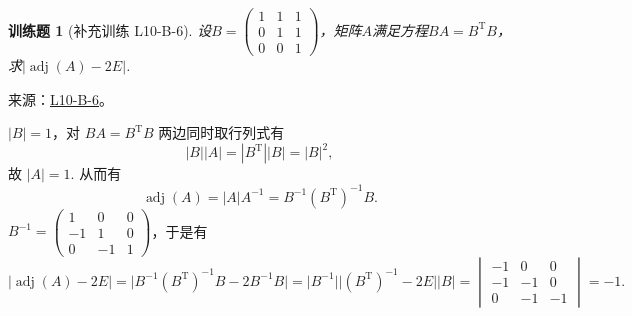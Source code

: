 \documentclass[UTF8,12pt,a4paper,fontset=fandol]{ctexart}
\newtheorem{exercise}{训练题}[section]
\begin{document}
\begin{exercise}[补充训练 L10-B-6]\label{prob:L10-B-6}
设$B=\begin{pmatrix}
                1 & 1 & 1 \\ 0 & 1 & 1 \\ 0 & 0 & 1
            \end{pmatrix}$，矩阵$A$满足方程$BA=B^\mathrm{T}B$，求$|\operatorname{adj}(A)-2E|$.
\end{exercise}
\noindent 来源：\href{https://github.com/yhwu-is/Linear-Algebra-Left-Undone/blob/new/%E8%AE%B2%E4%B9%89/%E4%B8%93%E9%A2%98/10%20%E8%A1%8C%E5%88%97%E5%BC%8F.tex}{L10-B-6}。
\begin{solve}
$|B|=1$，对 $BA=B^\mathrm{T}B$ 两边同时取行列式有
            \[
                |B||A| = |B^\mathrm{T}||B| = |B|^2,
            \]
            故 $|A| = 1$. 从而有
            \[
                \operatorname{adj}(A) = |A|A^{-1} = B^{-1} \left(B^\mathrm{T}\right)^{-1} B.
            \]
            $B^{-1} = \begin{pmatrix}
                1 & 0 & 0 \\ -1 & 1 & 0 \\ 0 & -1 & 1
            \end{pmatrix}$，于是有
            \[
                |\operatorname{adj}(A)-2E| = \lvert B^{-1} \left(B^\mathrm{T}\right)^{-1} B - 2 B^{-1} B \rvert
                         = \lvert B^{-1} \rvert \lvert \left(B^\mathrm{T}\right)^{-1} - 2E \rvert \lvert B \rvert
                         = \begin{vmatrix}
                            -1 & 0 & 0 \\ -1 & -1 & 0 \\ 0 & -1 & -1
                         \end{vmatrix}
                         = -1.
            \]
\end{solve}
\end{document}
